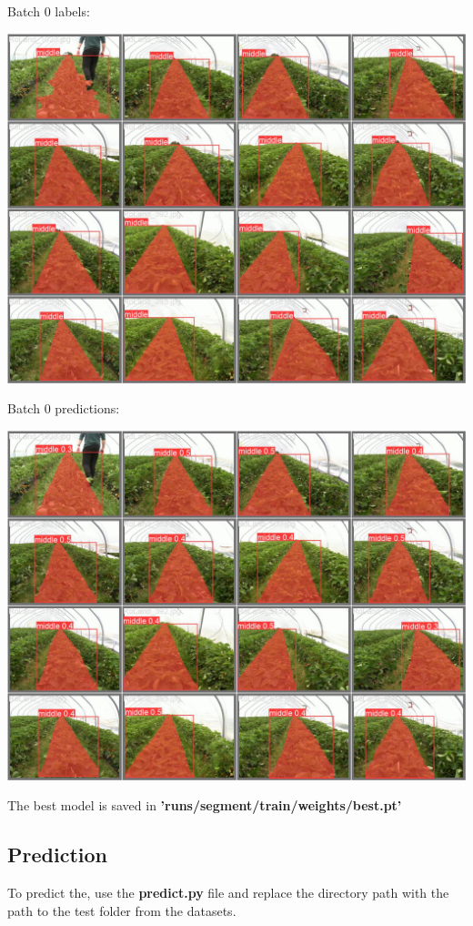 \documentclass[12pt]{article}
\begin{document}
Batch 0 labels:
\begin{center}
\includegraphics[width=1.0\textwidth]{Bilder/val_batch0_labels}
\end{center}
\newpage

Batch 0 predictions:
\begin{center}
\includegraphics[width=1.0\textwidth]{Bilder/val_batch0_pred}
\end{center}

The best model is saved in \textbf{'runs/segment/train/weights/best.pt'}

\subsection{Prediction}
To predict the, use the \textbf{predict.py} file and replace the directory path with the path to the test folder from the datasets.
\end{document}
